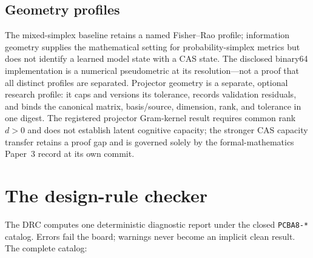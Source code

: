 \documentclass[11pt]{amsart}
\theoremstyle{definition}
\theoremstyle{remark}
\begin{document}
\subsection{Geometry profiles}
The mixed-simplex baseline retains a named Fisher--Rao profile; information geometry supplies the mathematical setting for probability-simplex metrics \cite{amari} but does not identify a learned model state with a CAS state. The disclosed binary64 implementation is a numerical pseudometric at its resolution---not a proof that all distinct profiles are separated. Projector geometry is a separate, optional research profile: it caps and versions its tolerance, records validation residuals, and binds the canonical matrix, basis/source, dimension, rank, and tolerance in one digest. The registered projector Gram-kernel result requires common rank $d>0$ and does not establish latent cognitive capacity; the stronger CAS capacity transfer retains a proof gap and is governed solely by the formal-mathematics Paper~3 record at its own commit.

\section{The design-rule checker}\label{sec:drc}

The DRC computes one deterministic diagnostic report under the closed \texttt{PCBA8-*} catalog. Errors fail the board; warnings never become an implicit clean result. The complete catalog:
\end{document}
